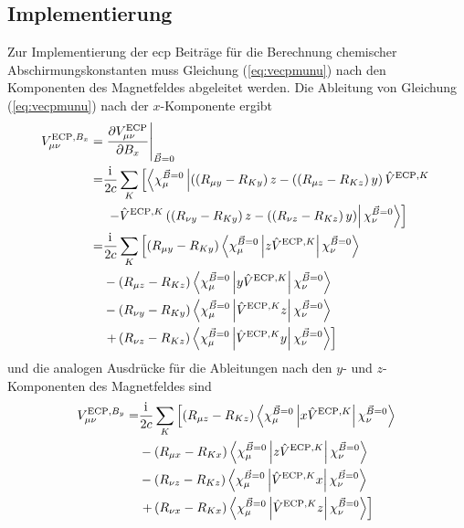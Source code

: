 	\subsection{Implementierung}
	Zur Implementierung der \ac{ecp} Beiträge für die Berechnung chemischer Abschirmungskonstanten muss Gleichung (\ref{eq:vecpmunu}) nach den Komponenten des Magnetfeldes abgeleitet werden. Die Ableitung von Gleichung (\ref{eq:vecpmunu}) nach der $x$-Komponente ergibt
	\begin{equation}\label{eq:vecpdbx}
	\begin{aligned}
	V_{\mu\nu}^{\textrm{ECP},B_x}=&\left.\frac{\partial V_{\mu\nu}^{\textrm{ECP}}}{\partial B_x}\right\vert_{\vec{B}=0}\\
	=&\frac{\mathrm{i}\mkern1mu}{2c}\sum_K\left[\left\langle\chi_\mu^{\vec{B}=0}\left\vert\left(\left(R_{\mu y}-R_{Ky}\right)z-(\left(R_{\mu z}-R_{Kz}\right)y\right)\hat{V}^{\textrm{ECP},K}\right.\right.\right.\\
	&\left.\left.\left.-\hat{V}^{\textrm{ECP},K}\left(\left(R_{\nu y}-R_{Ky}\right)z-(\left(R_{\nu z}-R_{Kz}\right)y\right)\right\vert\chi_\nu^{\vec{B}=0}\right\rangle\right]\\
	=&\frac{\mathrm{i}\mkern1mu}{2c}\sum_K\left[\left(R_{\mu y}-R_{Ky}\right)\left\langle\chi_\mu^{\vec{B}=0}\left\vert z\hat{V}^{\textrm{ECP},K}\right\vert\chi_\nu^{\vec{B}=0}\right\rangle\right.\\
	&-\left(R_{\mu z}-R_{Kz}\right)\left\langle\chi_\mu^{\vec{B}=0}\left\vert y\hat{V}^{\textrm{ECP},K}\right\vert\chi_\nu^{\vec{B}=0}\right\rangle\\
	&-\left(R_{\nu y}-R_{Ky}\right)\left\langle\chi_\mu^{\vec{B}=0}\left\vert \hat{V}^{\textrm{ECP},K} z\right\vert\chi_\nu^{\vec{B}=0}\right\rangle\\
	&\left.+\left(R_{\nu z}-R_{Kz}\right)\left\langle\chi_\mu^{\vec{B}=0}\left\vert \hat{V}^{\textrm{ECP},K} y\right\vert\chi_\nu^{\vec{B}=0}\right\rangle\right]
	\end{aligned}
	\end{equation}
	und die analogen Ausdrücke für die Ableitungen nach den $y$- und $z$- Komponenten des Magnetfeldes sind 
	\begin{equation}\label{eq:vecpdby}
	\begin{aligned}
	V_{\mu\nu}^{\textrm{ECP},B_y}=&\frac{\mathrm{i}\mkern1mu}{2c}\sum_K\left[\left(R_{\mu z}-R_{Kz}\right)\left\langle\chi_\mu^{\vec{B}=0}\left\vert x\hat{V}^{\textrm{ECP},K}\right\vert\chi_\nu^{\vec{B}=0}\right\rangle\right.\\
	&-\left(R_{\mu x}-R_{Kx}\right)\left\langle\chi_\mu^{\vec{B}=0}\left\vert z\hat{V}^{\textrm{ECP},K}\right\vert\chi_\nu^{\vec{B}=0}\right\rangle\\
	&-\left(R_{\nu z}-R_{Kz}\right)\left\langle\chi_\mu^{\vec{B}=0}\left\vert \hat{V}^{\textrm{ECP},K}x\right\vert\chi_\nu^{\vec{B}=0}\right\rangle\\
	&\left.+\left(R_{\nu x}-R_{Kx}\right)\left\langle\chi_\mu^{\vec{B}=0}\left\vert \hat{V}^{\textrm{ECP},K} z\right\vert\chi_\nu^{\vec{B}=0}\right\rangle\right]
	\end{aligned}
	\end{equation}
	
